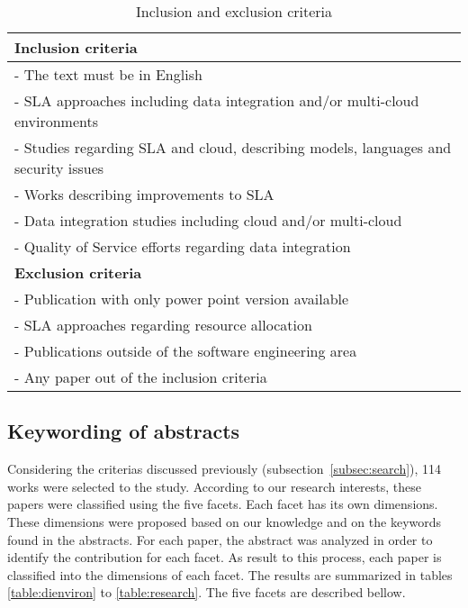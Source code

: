 \begin{table}[!htb]
\begin{center}
\begin{tabular}{p{10cm}}
\bottomrule \hline
\textbf{Inclusion criteria} \\ 
\hline 
- The text must be in English \\ 
- SLA approaches including data integration and/or multi-cloud environments\\
- Studies regarding SLA and cloud, describing models, languages and security issues \\
- Works describing improvements to SLA \\
- Data integration studies including cloud and/or multi-cloud  \\
- Quality of Service efforts regarding data integration \\
\bottomrule \hline 
\textbf{Exclusion criteria} \\ 
\hline 
- Publication with only power point version available \\ 
- SLA approaches regarding resource allocation \\
- Publications outside of the software engineering area \\
- Any paper out of the inclusion criteria  \\
\bottomrule \hline
\end{tabular} 
\end{center}
\caption{Inclusion and exclusion criteria}\label{table:criteria}
\end{table}

\subsection{Keywording of abstracts}

Considering the criterias discussed previously (subsection~\ref{subsec:search}),
114 works were selected to the study. 
According to our research interests, these papers were classified using the five facets. 
Each facet has its own dimensions. 
These dimensions were proposed based on our knowledge and on the keywords found in the abstracts.   
For each paper, the abstract
was analyzed in order to identify the contribution for each facet.
As result to this process, each paper is classified into the dimensions of each facet. 
The results are summarized in tables \ref{table:dienviron} to \ref{table:research}. 
The five facets are described bellow.

